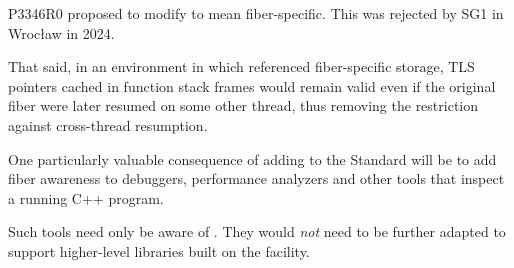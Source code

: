 P3346R0\cite{P3346R0} proposed to modify \tlocal to mean fiber-specific. This
was rejected by SG1 in Wrocław in 2024.\cite{wroclawp3346}

That said, in an environment in which \tlocal referenced fiber-specific
storage, TLS pointers cached in function stack frames would remain valid even
if the original fiber were later resumed on some other thread, thus removing
the restriction against cross-thread resumption.

 One particularly valuable consequence of adding \fiber to
the Standard will be to add fiber awareness to debuggers, performance
analyzers and other tools that inspect a running C++ program.

Such tools need only be aware of \fiber. They would \emph{not} need to be
further adapted to support higher-level libraries built on
the \fiber facility.

\newpage
